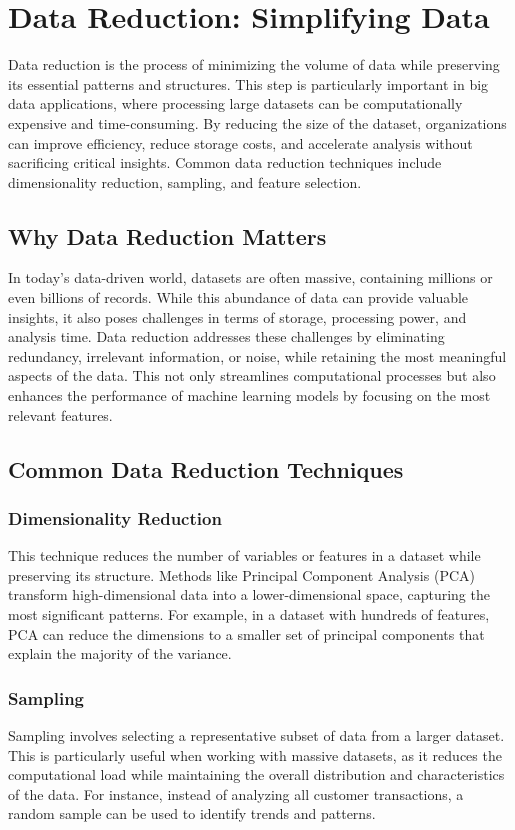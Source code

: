 \documentclass[12pt]{article}
\begin{document}
\section{Data Reduction: Simplifying Data}

Data reduction is the process of minimizing the volume of data while preserving its essential patterns and structures. This step is particularly important in big data applications, where processing large datasets can be computationally expensive and time-consuming. By reducing the size of the dataset, organizations can improve efficiency, reduce storage costs, and accelerate analysis without sacrificing critical insights. Common data reduction techniques include dimensionality reduction, sampling, and feature selection.

\subsection{Why Data Reduction Matters}

In today’s data-driven world, datasets are often massive, containing millions or even billions of records. While this abundance of data can provide valuable insights, it also poses challenges in terms of storage, processing power, and analysis time. Data reduction addresses these challenges by eliminating redundancy, irrelevant information, or noise, while retaining the most meaningful aspects of the data. This not only streamlines computational processes but also enhances the performance of machine learning models by focusing on the most relevant features.

\subsection{Common Data Reduction Techniques}

\subsubsection{Dimensionality Reduction}
This technique reduces the number of variables or features in a dataset while preserving its structure. Methods like Principal Component Analysis (PCA) transform high-dimensional data into a lower-dimensional space, capturing the most significant patterns. For example, in a dataset with hundreds of features, PCA can reduce the dimensions to a smaller set of principal components that explain the majority of the variance.

\subsubsection{Sampling}
Sampling involves selecting a representative subset of data from a larger dataset. This is particularly useful when working with massive datasets, as it reduces the computational load while maintaining the overall distribution and characteristics of the data. For instance, instead of analyzing all customer transactions, a random sample can be used to identify trends and patterns.
\end{document}
